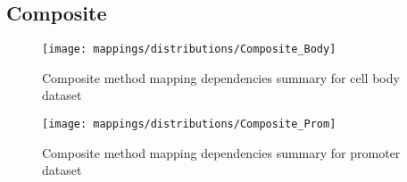\pagebreak
\subsection{Composite}

\begin{figure}[H]
	\centering
	\texttt{[image: mappings/distributions/Composite\_Body]}
	\caption{Composite method mapping dependencies summary for cell body dataset}
	\label{fig:map_body_comp}
\end{figure}

\begin{figure}[H]
	\centering
	\texttt{[image: mappings/distributions/Composite\_Prom]}
	\caption{Composite method mapping dependencies summary for promoter dataset}
	\label{fig:map_prom_comp}
\end{figure}